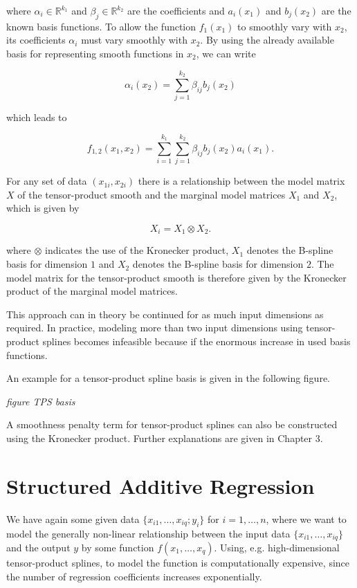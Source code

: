 \documentclass[10pt,a4paper]{article}
\begin{document}
where $\alpha_i \in \mathbb{R}^{k_1}$ and $\beta_j \in \mathbb{R}^{k_2}$ are the coefficients and $a_i(x_1)$ and $b_j(x_2)$ are the known basis functions. To allow the function $f_1(x_1)$ to smoothly vary with $x_2$, its coefficients $\alpha_i$ must vary smoothly with $x_2$. By using the already available basis for representing smooth functions in $x_2$, we can write

$$\alpha_i(x_2) = \sum_{j=1}^{k_2} \beta_{ij} b_j(x_2)$$

which leads to

$$f_{1,2}(x_1, x_2) = \sum_{i=1}^{k_1} \sum_{j=1}^{k_2} \beta_{ij} b_j(x_2) a_i(x_1).$$

For any set of data $(x_{1i}, x_{2i})$ there is a relationship between the model matrix $X$ of the tensor-product smooth and the marginal model matrices $X_1$ and $X_2$, which is given by 

$$X_i = X_1 \otimes X_2.$$

where $\otimes$ indicates the use of the Kronecker product, $X_1$ denotes the B-spline basis for dimension $1$ and $X_2$ denotes the B-spline basis for dimension $2$. The model matrix for the tensor-product smooth is therefore given by the Kronecker product of the marginal model matrices. 

This approach can in theory be continued for as much input dimensions as required. In practice, modeling more than two input dimensions using tensor-product splines becomes infeasible because if the enormous increase in used basis functions. 

An example for a tensor-product spline basis is given in the following figure.

\emph{figure TPS basis}

A smoothness penalty term for tensor-product splines can also be constructed using the Kronecker product. Further explanations are given in Chapter 3.


\section{Structured Additive Regression}

We have again some given data $\{x_{i1}, \dots, x_{iq}; y_i\}$ for $i = 1, \dots, n$, where we want to model the generally non-linear relationship between the input data $\{x_{i1}, \dots, x_{iq}\}$ and the output $y$ by some function $f(x_1, \dots, x_q)$.  Using, e.g. high-dimensional tensor-product splines, to model the function is computationally expensive, since the number of regression coefficients increases exponentially.
\end{document}
